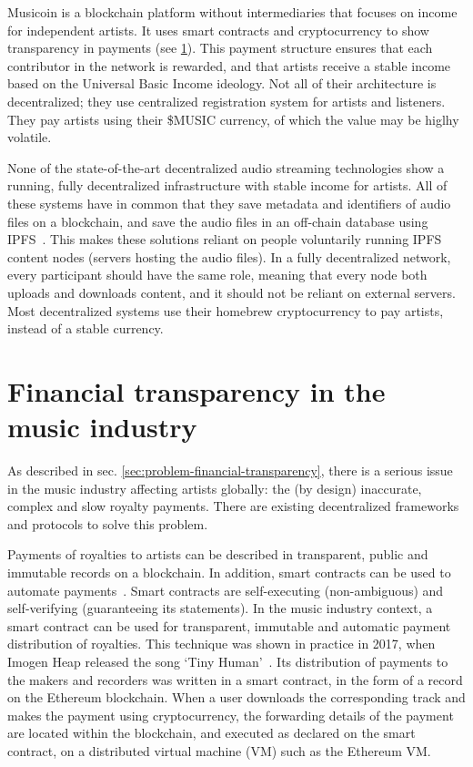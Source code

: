 Musicoin is a blockchain platform without intermediaries that focuses on income for independent artists. It uses smart contracts and cryptocurrency to show transparency in payments (see \ref{sec:smart-contracts}). This payment structure ensures that each contributor in the network is rewarded, and that artists receive a stable income based on the Universal Basic Income ideology. Not all of their architecture is decentralized; they use centralized registration system for artists and listeners. They pay artists using their \$MUSIC currency, of which the value may be higlhy volatile.

None of the state-of-the-art decentralized audio streaming technologies show a running, fully decentralized infrastructure with stable income for artists. All of these systems have in common that they save metadata and identifiers of audio files on a blockchain, and save the audio files in an off-chain database using IPFS~\citep{benet2014ipfs}. This makes these solutions reliant on people voluntarily running IPFS content nodes (servers hosting the audio files). In a fully decentralized network, every participant should have the same role, meaning that every node both uploads and downloads content, and it should not be reliant on external servers. Most decentralized systems use their homebrew cryptocurrency to pay artists, instead of a stable currency.

\section{Financial transparency in the music industry}
\label{sec:smart-contracts}
As described in sec. \ref{sec:problem-financial-transparency}, there is a serious issue in the music industry affecting artists globally: the (by design) inaccurate, complex and slow royalty payments. There are existing decentralized frameworks and protocols to solve this problem.

Payments of royalties to artists can be described in transparent, public and immutable records on a blockchain. In addition, smart contracts can be used to automate payments~\citep{buterin2014next}. Smart contracts are self-executing (non-ambiguous) and self-verifying (guaranteeing its statements). In the music industry context, a smart contract can be used for transparent, immutable and automatic payment distribution of royalties. This technique was shown in practice in 2017, when Imogen Heap released the song `Tiny Human'~\citep{heap2017blockchain}. Its distribution of payments to the makers and recorders was written in a smart contract, in the form of a record on the Ethereum blockchain. When a user downloads the corresponding track and makes the payment using cryptocurrency, the forwarding details of the payment are located within the blockchain, and executed as declared on the smart contract, on a distributed virtual machine (VM) such as the Ethereum VM.

